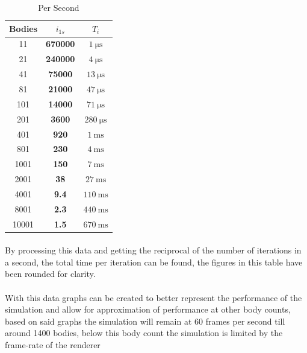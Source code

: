 \pagebreak

\begin{table}
\footnotesize
\centering
\caption{Per Second}
\def\arraystretch{1.5}
\begin{tabular}{|c|c|c|} \hline
Bodies & $i_{1s}$ & $T_i$\\ \hline
    11 & \textbf{670000}   & $\SI{1}{\micro\second}$    \\ \hline
    21 & \textbf{240000}   & $\SI{4}{\micro\second}$   \\ \hline
    41 &  \textbf{75000}   & $\SI{13}{\micro\second}$  \\ \hline
    81 &  \textbf{21000}   & $\SI{47}{\micro\second}$  \\ \hline
   101 &  \textbf{14000}   & $\SI{71}{\micro\second}$  \\ \hline
   201 &   \textbf{3600}   & $\SI{280}{\micro\second}$ \\ \hline
   401 &    \textbf{920}   & $\SI{1}{\milli\second}$   \\ \hline
   801 &    \textbf{230}   & $\SI{4}{\milli\second}$   \\ \hline
  1001 &    \textbf{150}   & $\SI{7}{\milli\second}$   \\ \hline
  2001 &     \textbf{38}   & $\SI{27}{\milli\second}$  \\ \hline
  4001 &      \textbf{9.4} & $\SI{110}{\milli\second}$ \\ \hline
  8001 &      \textbf{2.3} & $\SI{440}{\milli\second}$ \\ \hline
 10001 &      \textbf{1.5} & $\SI{670}{\milli\second}$ \\ \hline
\end{tabular}
\vspace{-40pt}
\end{table}

\paragraph{}
By processing this data and getting the reciprocal of the number of iterations in a second, the total time per iteration can be found, the figures in this table have been rounded for clarity.

\paragraph{}
With this data graphs can be created to better represent the performance of the simulation and allow for approximation of performance at other body counts, based on said graphs the simulation will remain at 60 frames per second till around 1400 bodies, below this body count the simulation is limited by the frame-rate of the renderer

